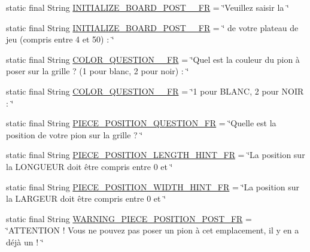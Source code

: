 \begin{DoxyCompactItemize}
\item 
static final String \hyperlink{interfacecom_1_1publisher_1_1utils_1_1PostsPublisher_af7be1118698ae0c31d9d266931a814d9}{I\-N\-I\-T\-I\-A\-L\-I\-Z\-E\-\_\-\-B\-O\-A\-R\-D\-\_\-\-P\-O\-S\-T\-\_\-\_\-\-F\-R} = \char`\"{}Veuillez saisir la \char`\"{}
\item 
static final String \hyperlink{interfacecom_1_1publisher_1_1utils_1_1PostsPublisher_a82068d867e87a9c2deac372701d8edd4}{I\-N\-I\-T\-I\-A\-L\-I\-Z\-E\-\_\-\-B\-O\-A\-R\-D\-\_\-\-P\-O\-S\-T\-\_\-\_\-\-F\-R} = \char`\"{} de votre plateau de jeu (compris entre 4 et 50) \-: \char`\"{}
\item 
static final String \hyperlink{interfacecom_1_1publisher_1_1utils_1_1PostsPublisher_a6462bf8db5ab80d7a7ea91b6369d9257}{C\-O\-L\-O\-R\-\_\-\-Q\-U\-E\-S\-T\-I\-O\-N\-\_\-\_\-\-F\-R} = \char`\"{}Quel est la couleur du pion à poser sur la grille ? (1 pour blanc, 2 pour noir) \-: \char`\"{}
\item 
static final String \hyperlink{interfacecom_1_1publisher_1_1utils_1_1PostsPublisher_a6554d01af8ba346aae5933852277afc3}{C\-O\-L\-O\-R\-\_\-\-Q\-U\-E\-S\-T\-I\-O\-N\-\_\-\_\-\-F\-R} = \char`\"{}1 pour B\-L\-A\-N\-C, 2 pour N\-O\-I\-R \-: \char`\"{}
\item 
static final String \hyperlink{interfacecom_1_1publisher_1_1utils_1_1PostsPublisher_a7ab21d55f82b87ad40bc9cef89566b86}{P\-I\-E\-C\-E\-\_\-\-P\-O\-S\-I\-T\-I\-O\-N\-\_\-\-Q\-U\-E\-S\-T\-I\-O\-N\-\_\-\-F\-R} = \char`\"{}Quelle est la position de votre pion sur la grille ? \char`\"{}
\item 
static final String \hyperlink{interfacecom_1_1publisher_1_1utils_1_1PostsPublisher_a5ad6c62157ca20da2cf13e620415392a}{P\-I\-E\-C\-E\-\_\-\-P\-O\-S\-I\-T\-I\-O\-N\-\_\-\-L\-E\-N\-G\-T\-H\-\_\-\-H\-I\-N\-T\-\_\-\-F\-R} = \char`\"{}La position sur la L\-O\-N\-G\-U\-E\-U\-R doit être compris entre 0 et \char`\"{}
\item 
static final String \hyperlink{interfacecom_1_1publisher_1_1utils_1_1PostsPublisher_a5696a75dded425dcb50851401eee3a4d}{P\-I\-E\-C\-E\-\_\-\-P\-O\-S\-I\-T\-I\-O\-N\-\_\-\-W\-I\-D\-T\-H\-\_\-\-H\-I\-N\-T\-\_\-\-F\-R} = \char`\"{}La position sur la L\-A\-R\-G\-E\-U\-R doit être compris entre 0 et \char`\"{}
\item 
static final String \hyperlink{interfacecom_1_1publisher_1_1utils_1_1PostsPublisher_a14280a3738e571750ffca034edabd4db}{W\-A\-R\-N\-I\-N\-G\-\_\-\-P\-I\-E\-C\-E\-\_\-\-P\-O\-S\-I\-T\-I\-O\-N\-\_\-\-P\-O\-S\-T\-\_\-\-F\-R} = \char`\"{}A\-T\-T\-E\-N\-T\-I\-O\-N ! Vous ne pouvez pas poser un pion à cet emplacement, il y en a déjà un ! \char`\"{}

\end{DoxyCompactItemize}
